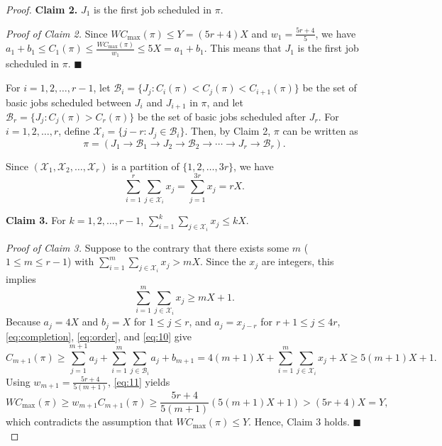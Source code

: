 ﻿\documentclass[12pt]{article}
\begin{document}
\begin{sloppypar}
\begin{proof}
            \textbf{Claim 2.} $J_1$ is the first job scheduled in $\pi$.
            
            \textit{Proof of Claim 2.}  Since $WC_{\max}(\pi) \leq Y=(5r+4)X$ and $w_1=\frac{5r+4}{5}$, we have $a_1+b_1 \leq C_1(\pi) \leq \frac{WC_{\max}(\pi)}{w_1} \leq 5X=a_1+b_1$. This means that $J_1$ is the first job scheduled in $\pi$.  \hfill$\blacksquare$
            
            For $i=1, 2, \ldots, r-1$, let $\mathcal{B}_i=\{J_j: C_i(\pi) < C_j(\pi) < C_{i+1}(\pi)\}$ be the set of basic jobs scheduled between $J_i$ and $J_{i+1}$ in $\pi$, and let $\mathcal{B}_r=\{J_j: C_j(\pi) > C_r(\pi)\}$ be the set of basic jobs scheduled after $J_r$. For $i=1, 2, \ldots, r$, define $\mathcal{X}_i=\{j-r: J_j \in  \mathcal{B}_i\}$. Then, by Claim 2, $\pi$ can be written as 
            \begin{equation} \label{eq:order}
                \pi=(J_1 \to \mathcal{B}_1 \to J_2 \to \mathcal{B}_2 \to \cdots \to J_r \to \mathcal{B}_r).
            \end{equation} 
            
            Since $(\mathcal{X}_1, \mathcal{X}_2, \ldots, \mathcal{X}_r)$ is a partition of $\{1, 2, \ldots, 3r\}$, we have 
            \begin{equation} \label{eq:00}
                \sum_{i=1}^r \sum_{j \in \mathcal{X}_i} x_j =\sum_{j=1}^{3r} x_j =rX.
            \end{equation} 
            
            \textbf{Claim 3.} For $k=1, 2, \ldots, r-1$, $\sum_{i=1}^k \sum_{j \in \mathcal{X}_i} x_j \leq kX$. 
            
            \textit{Proof of Claim 3.} Suppose to the contrary that there exists some $m$ ($1 \leq m \leq r-1$) with $\sum_{i=1}^m \sum_{j \in \mathcal{X}_i} x_j > mX$. Since the $x_j$ are integers, this implies 
            \begin{equation}\label{eq:10}
                \sum_{i=1}^m \sum_{j \in \mathcal{X}_i} x_j \geq mX+1. 
            \end{equation}
            Because $a_j=4X$ and $b_j=X$ for $1 \leq j \leq r$, and $a_j=x_{j-r}$ for $r+1 \leq j \leq 4r$, \cref{eq:completion}, \cref{eq:order}, and \cref{eq:10} give  
            \begin{equation} \label{eq:11}
                C_{m+1}(\pi) \geq \sum_{j=1}^{m+1} a_j+\sum_{i=1}^m \sum_{j \in \mathcal{B}_i} a_j+b_{m+1} =4(m+1)X+\sum_{i=1}^m \sum_{j \in \mathcal{X}_i} x_j +X \geq 5(m+1)X+1.
            \end{equation}
            Using $w_{m+1}=\frac{5r+4}{5(m+1)}$, \cref{eq:11} yields
            \begin{equation} \label{eq:12}
                W C_{\max}(\pi) \geq w_{m+1} C_{m+1}(\pi) \geq \frac{5r+4}{5(m+1)} (5(m+1)X+1)>(5r+4)X=Y,
            \end{equation} 
            which contradicts the assumption that $W C_{\max}(\pi) \leq Y$. Hence, Claim 3 holds. \hfill$\blacksquare$
            

\end{proof}
\end{sloppypar}
\end{document}
